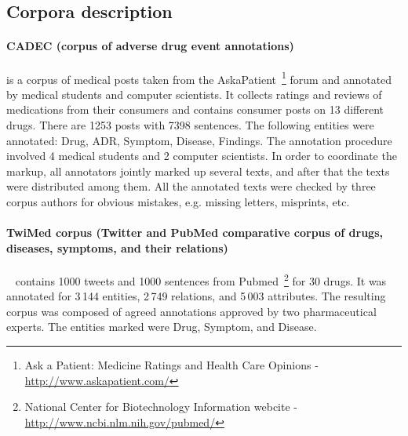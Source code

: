 \documentclass[a4paper,fleqn,longmktitle]{cas-dc}
\begin{document}
% 

%



\subsection{Corpora description}

\paragraph{CADEC (corpus of adverse drug event annotations)
~\cite{karimi2015cadec}} is a corpus of medical posts taken from the AskaPatient~\footnote{Ask a Patient: Medicine Ratings and Health Care Opinions - \url{http://www.askapatient.com/}}
forum and annotated by medical students and computer scientists. It collects ratings and reviews of medications from their consumers and contains consumer posts on 13 different drugs. There are 1253 posts with 7398 sentences. The following entities were annotated: Drug, ADR, Symptom, Disease, Findings. The annotation procedure involved 4 medical students and 2 computer scientists. In order to coordinate the markup, all annotators jointly marked up several texts, and after that the texts were distributed among them. All the annotated texts were checked by three corpus authors for obvious mistakes, e.g. missing letters, misprints, etc.

\paragraph{TwiMed corpus (Twitter and PubMed comparative corpus of drugs, diseases, symptoms, and their relations)}~\cite{alvaro2017twimed} contains 1000 tweets and 1000 sentences from Pubmed~\footnote{National Center for Biotechnology Information webcite - \url{http://www.ncbi.nlm.nih.gov/pubmed/}}
for 30 drugs. It was annotated for 3\,144 entities, 2\,749 relations, and 5\,003 attributes. The resulting corpus was composed of agreed annotations approved by two pharmaceutical experts. The entities marked were Drug, Symptom, and Disease.
\end{document}
